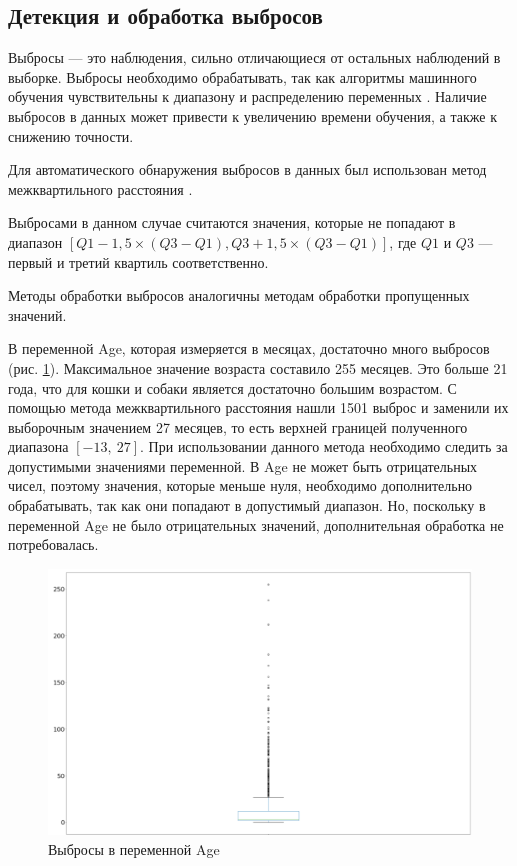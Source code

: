 \documentclass[14pt]{mmcs_article}
\begin{document}
\subsection{Детекция и обработка выбросов}

Выбросы — это наблюдения, сильно отличающиеся от остальных наблюдений в выборке. Выбросы необходимо обрабатывать, так как алгоритмы машинного обучения чувствительны к диапазону и распределению переменных \cite{lib:outlier}. Наличие выбросов в данных может привести к увеличению времени обучения, а также к снижению точности.

Для автоматического обнаружения выбросов в данных был использован метод межквартильного расстояния \cite{lib:outlier2}. 

Выбросами в данном случае считаются значения, которые не попадают в диапазон $[Q1 - 1,5 \times (Q3 - Q1), Q3 + 1,5 \times (Q3 - Q1)]$, где $Q1$ и $Q3$ --- первый и третий квартиль соответственно.

Методы обработки выбросов аналогичны методам обработки пропущенных значений. 

В переменной Age, которая измеряется в месяцах, достаточно много выбросов (рис. \ref{analyse:ageoutlier}). Максимальное значение возраста составило 255 месяцев. Это больше 21 года, что для кошки и собаки является достаточно большим возрастом. С помощью метода межквартильного расстояния нашли 1501 выброс и заменили их выборочным значением 27 месяцев, то есть верхней границей полученного диапазона $[-13,\ 27]$. При использовании данного метода необходимо следить за допустимыми значениями переменной. В Age не может быть отрицательных чисел, поэтому значения, которые меньше нуля, необходимо дополнительно обрабатывать, так как они попадают в допустимый диапазон. Но, поскольку в переменной Age не было отрицательных значений, дополнительная обработка не потребовалась.

\begin{figure}[H]
	\centering
	\includegraphics[scale=0.7]{ageoutlier.png}
	\caption{Выбросы в переменной Age}\label{analyse:ageoutlier}
\end{figure}
\end{document}
